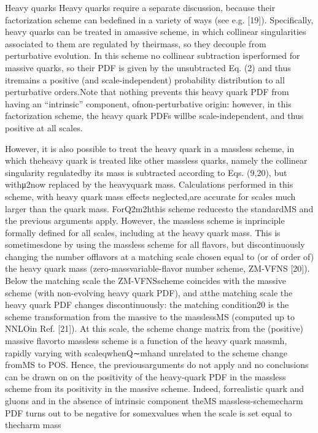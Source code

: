 \documentclass[9pt]{beamer}
\begin{document}
\begin{frame}{Heavy quarks}
    Heavy quarks require a separate discussion,  because their factorization
    scheme can bedefined in a variety of ways (see e.g. [19]).  Specifically,
    heavy quarks can be treated in amassive scheme,  in which collinear
    singularities associated to them are regulated by theirmass, so they decouple
    from perturbative evolution. In this scheme no collinear subtraction
    isperformed for massive quarks, so their PDF is given by the unsubtracted Eq.
    (2) and thus itremains a positive (and scale-independent) probability
    distribution to all perturbative orders.Note that nothing prevents this heavy
    quark PDF from having an “intrinsic” component, ofnon-perturbative origin:
    however, in this factorization scheme, the heavy quark PDFs willbe
    scale-independent, and thus positive at all scales.

    However, it is also possible to treat the heavy quark in a massless scheme,
    in which theheavy quark is treated like other massless quarks, namely the
    collinear singularity regulatedby its mass is subtracted according to Eqs.
    (9,20), but withμ2now replaced by the heavyquark mass.  Calculations performed
    in this scheme, with heavy quark mass effects neglected,are accurate for scales
    much larger than the quark mass.  ForQ2m2hthis scheme reducesto the standardMS
    and the previous arguments apply.  However, the massless scheme is inprinciple
    formally defined for all scales, including at the heavy quark mass. This is
    sometimesdone by using the massless scheme for all flavors, but discontinuously
    changing the number offlavors at a matching scale chosen equal to (or of order
    of) the heavy quark mass (zero-massvariable-flavor number scheme,  ZM-VFNS
    [20]).  Below the matching scale the ZM-VFNSscheme  coincides  with  the
    massive  scheme  (with non-evolving  heavy  quark  PDF),  and  atthe matching
    scale the heavy quark PDF changes discontinuously:  the matching condition20 is
    the scheme transformation from the massive to the masslessMS (computed up to
    NNLOin  Ref.  [21]).   At  this  scale,  the  scheme  change  matrix  from  the
    (positive) massive  flavorto massless scheme is a function of the heavy quark
    massmh, rapidly varying with scaleqwhenQ∼mhand unrelated to the scheme change
    fromMS to POS. Hence, the previousarguments do not apply and no conclusions can
    be drawn on on the positivity of the heavy-quark PDF in the massless scheme
    from its positivity in the massive scheme.  Indeed,  forrealistic quark and
    gluons and in the absence of intrinsic component theMS massless-schemecharm PDF
    turns out to be negative for somexvalues when the scale is set equal to
    thecharm mass
\end{frame}
\end{document}
